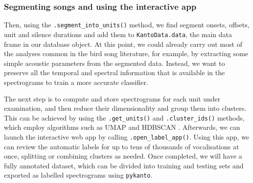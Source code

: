 \subsubsection{Segmenting songs and using the interactive app}

Then, using the \texttt{.segment\_into\_units()} method, we find segment onsets,
offsets, unit and silence durations and add them to \texttt{KantoData.data}, the
main data frame in our database object. At this point, we could already carry
out most of the analyses common in the bird song literature, for example, by
extracting some simple acoustic parameters from the segmented data. Instead, we
want to preserve all the temporal and spectral information that is available in
the spectrograms to train a more accurate classifier.

The next step is to compute and store spectrograms for each unit under
examination, and then reduce their dimensionality and group them into clusters.
This can be achieved by using the \texttt{.get\_units()} and \texttt{.cluster\_ids()} methods, which
employ algorithms such as UMAP \parencite{mcinnes2018} and HDBSCAN
\parencite{mcinnes2017}. Afterwards, we can launch the interactive web app by
calling \texttt{.open\_label\_app()}. Using this app, we can review the automatic labels
for up to tens of thousands of vocalisations at once, splitting or combining
clusters as needed. Once completed, we will have a fully annotated dataset, which
can be divided into training and testing sets and exported as labelled
spectrograms using \texttt{pykanto}. 



